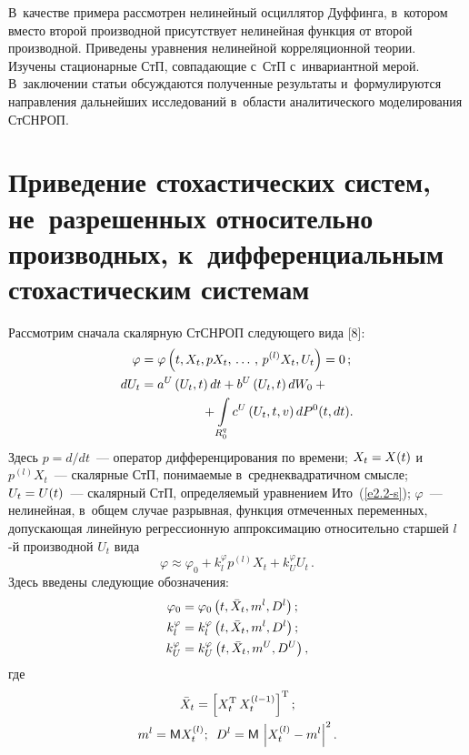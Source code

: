 \begin{multicols}{2}
  В~качестве примера рассмотрен нелинейный осциллятор Дуффинга, в~котором вместо второй производной присутствует 
  нелинейная функция от второй производной. Приведены уравнения нелинейной корреляционной теории. Изучены стационарные СтП, совпадающие с~СтП с~инвариантной мерой. 
  В~заключении статьи обсуждаются полученные результаты и~формулируются направления дальнейших исследований в~об\-ласти аналитического моделирования СтСНРОП.


\section{Приведение стохастических сис\-те\-м, 
не~разрешенных относительно производных, к~дифференциальным стохастическим системам}


Рассмотрим сначала скалярную СтСНРОП следующего вида [8]:
\begin{align}
\varphi&= \varphi \left(t, X_t, p X_t\tr p^{(l)} X_t, U_t\right)=0\,;\label{e2.1-s}
\\
dU_t &= a^U \left(U_t,t\right) dt + b^U \left(U_t,t\right) dW_0 + {}\notag\\
&\hspace*{17mm}{}+
\iii_{R_0^q} c^U \left(U_t,t,v\right) dP^0 (t,dt).
\label{e2.2-s}
\end{align}
Здесь $p=d/dt$~--- оператор дифференцирования по времени; $X_t \hm= X(t)$ и~$p^{(l)} X_t$~--- 
скалярные СтП, понимаемые в~среднеквадратичном смысле; $U_t\hm= U(t)$~--- скалярный СтП, определяемый уравнением Ито~(\ref{e2.2-s}); 
$\varphi$~--- нелинейная, в~общем случае разрывная, функция отмеченных переменных, \mbox{допускающая}
 линейную регрессионную аппроксимацию относительно 
старшей $l$-й производной $U_t$ вида
    \begin{equation}
    \varphi \approx \varphi_0+ k_l^\varphi p^{(l)} X_t + k_U^\varphi U_t\,.\label{e2.3-s}
    \end{equation}
Здесь введены следующие обозначения:
\begin{align*}
\varphi_0 &=\varphi_0 \tbxmdl; %
\\
k_l^\varphi &= k_l^\varphi\tbxmdl; %
\\
k_U^\varphi&=k_U^\varphi \tbxmdu, %
\end{align*}
где 
\begin{gather*}
{\bar X}_t =\left[  X_t^{\mathrm{T}} \, X_t^{(l-1)} \right]^{\mathrm{T}};\\
m^l ={\sf M} X_t^{(l)};\enskip D^l = {\sf M} \,\left\vert X_t^{(l)} -m^l\right\vert^2.
\end{gather*}

\end{multicols}
